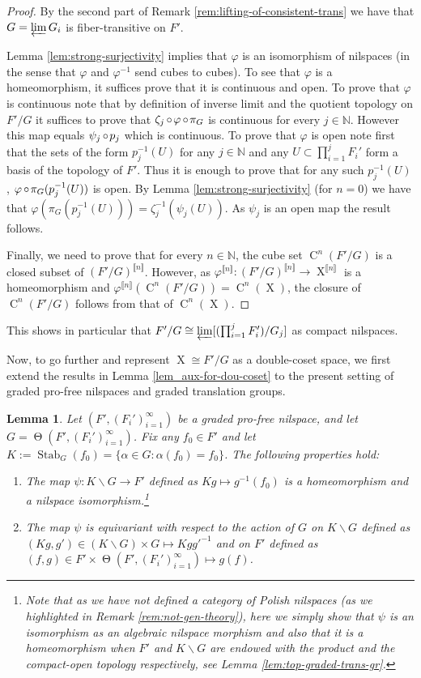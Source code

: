 \documentclass[a4paper,12pt,reqno]{amsart}
\newtheorem{lemma}[theorem]{Lemma}
\theoremstyle{definition}
\def\to{\rightarrow}
\newcommand*{\db}[1]{\llbracket #1\rrbracket}
\newcommand{\mb}{\mathbb}
\DeclareMathOperator{\stab}{Stab}
\DeclareMathOperator{\tran}{\Theta}
\DeclareMathOperator{\ns}{X}
\DeclareMathOperator{\co}{\circ\hspace{-0.02 cm}}
\DeclareMathOperator{\cu}{C}
\begin{document}
\begin{proof}
By the second part of Remark \ref{rem:lifting-of-consistent-trans} we have that $G=\varprojlim G_i$ is fiber-transitive on $F'$.

Lemma \ref{lem:strong-surjectivity} implies that $\varphi$ is an isomorphism of nilspaces (in the sense that $\varphi$ and $\varphi^{-1}$ send cubes to cubes). To see that $\varphi$ is a homeomorphism, it suffices prove that it is continuous and open. To prove that $\varphi$ is continuous note that by definition of inverse limit and the quotient topology on $F'/G$ it suffices to prove that $\zeta_j\co \varphi\co \pi_G$ is continuous for every $j\in \mb{N}$. However this map equals $\psi_j\co p_j$ which is continuous. To prove that $\varphi$ is open note first that the sets of the form $p_j^{-1}(U)$ for any $j\in \mb{N}$ and any $U\subset \prod_{i=1}^j F_i'$ form a basis of the topology of $F'$. Thus it is enough to prove that for any such $p_j^{-1}(U)$,  $\varphi\co \pi_G(p_j^{-1}(U))$ is open.  By Lemma \ref{lem:strong-surjectivity} (for $n=0$) we have that $\varphi(\pi_G(p_j^{-1}(U))) = \zeta_j^{-1}(\psi_j(U))$. As $\psi_j$ is an open map the result  follows.

Finally, we need to prove that for every $n\in \mb{N}$, the cube set $\cu^n(F'/G)$ is a closed subset of $(F'/G)^{\db{n}}$. However, as $\varphi^{\db{n}}:(F'/G)^{\db{n}}\to \ns^{\db{n}}$ is a homeomorphism  and $\varphi^{\db{n}}(\cu^n(F'/G))=\cu^n(\ns)$, the closure of $\cu^n(F'/G)$ follows from that of $\cu^n(\ns)$.
\end{proof}
This shows in particular that $F'/G\cong \varprojlim [(\prod_{i=1}^jF_i')/G_j]$ as  compact nilspaces.

\noindent Now, to go further and represent $\ns\cong F'/G$ as a double-coset space, we first extend the results in Lemma \ref{lem_aux-for-dou-coset} to the present setting of  graded pro-free nilspaces and graded translation groups.
\begin{lemma}\label{lem:inf-free-as-quo-of-trans-by-k}
Let $(F',(F_i')_{i=1}^\infty)$ be a graded pro-free nilspace, and let $G=\tran(F',(F_i')_{i=1}^\infty)$. Fix any $f_0\in F'$ and let $K:=\stab_G(f_0)=\{\alpha\in G: \alpha(f_0)=f_0\}$. The following properties hold:
\setlength{\leftmargini}{0.7cm}
\begin{enumerate}
    \item The map $\psi:K\backslash G\to F'$ defined as $Kg\mapsto g^{-1}(f_0)$ is a homeomorphism and a nilspace isomorphism.\footnote{Note that as we have not defined a category of \emph{Polish} nilspaces (as we highlighted in Remark \ref{rem:not-gen-theory}), here we simply show that $\psi$ is an isomorphism as an algebraic nilspace morphism  and also that it is a homeomorphism when $F'$ and $K\backslash G$ are endowed with the product and the compact-open topology respectively, see Lemma \ref{lem:top-graded-trans-gr}.}
    \item The map $\psi$ is equivariant with respect to the action of $G$ on $K\backslash G$ defined as $(Kg,g')\in (K\backslash G)\times G\mapsto Kg{g'}^{-1}$ and on $F'$ defined as  $(f,g)\in F'\times \tran(F',(F_i')_{i=1}^\infty)\mapsto g(f)$. 
\end{enumerate} 
\end{lemma}
\end{document}

